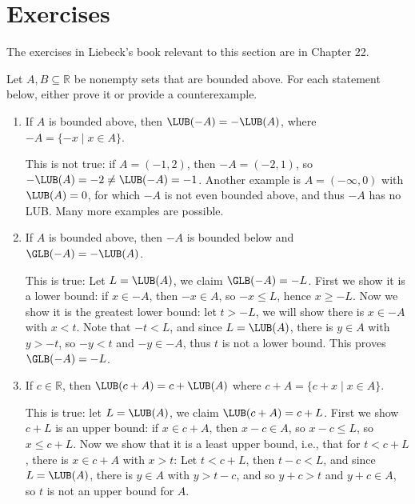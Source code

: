 \documentclass[11pt,dvipsnames]{book}
\numberwithin{figure}{section} %
\numberwithin{table}{section} %
\begin{document}

\section{Exercises}%
\label{upperboundsexercises}

The exercises in Liebeck's book relevant to this section are in Chapter 22.

\begin{exercise}
Let $A,B\subseteq \mathbb{R}$ be nonempty sets that are bounded above. For each statement below, either prove it or provide a counterexample.
\begin{enumerate}[label=(\alph*)]
\item If $A$ is bounded above, then $\LUB(-A)=-\LUB(A)$, where $-A=\{-x \; | \; x\in A\}$.
\begin{solution}
This is not true: if $A=(-1,2)$, then $-A=(-2,1)$, so $-\LUB(A)=-2\neq \LUB(-A)=-1$. Another example is $A = (-\infty, 0)$ with $\LUB(A) = 0$, for which $-A$ is not even bounded above, and thus $-A$ has no LUB. Many more examples are possible.
\end{solution}
\item If $A$ is bounded above, then $-A$ is bounded below and $\GLB(-A)=-\LUB(A)$.
\begin{solution}
This is true: Let $L=\LUB(A)$, we claim $\GLB(-A)=-L$. First we show it is a lower bound: if $x\in -A$, then $-x\in A$, so $-x\leq L$, hence $x\geq -L$. Now we show it is the greatest lower bound: let $t>-L$, we will show there is $x\in -A$ with $x<t$. Note that $-t<L$, and since $L=\LUB(A)$, there is $y\in A$ with $y>-t$, so $-y<t$ and $-y\in -A$, thus $t$ is not a lower bound. This proves $\GLB(-A)=-L$.
\end{solution}
\item If $c\in \mathbb{R}$, then $\LUB(c+A)=c+\LUB(A)$ where $c+A=\{c+x \; | \; x\in A\}$.
\begin{solution}
This is true: let $L=\LUB(A)$, we claim $\LUB(c+A)=c+L$. First we show $c+L$ is an upper bound: if $x\in c+A$, then $x-c\in A$, so $x-c\leq L$, so $x\leq c+L$. Now we show that it is a least upper bound, i.e., that for $t<c+L$, there is $x\in c+A$ with $x>t$: Let $t<c+L$, then $t-c<L$, and since $L=\LUB(A)$, there is $y\in A$ with $y>t-c$, and so $y+c>t$ and $y+c\in A$, so $t$ is not an upper bound for $A$.

\end{solution}
\end{enumerate}
\end{exercise}
\end{document}
